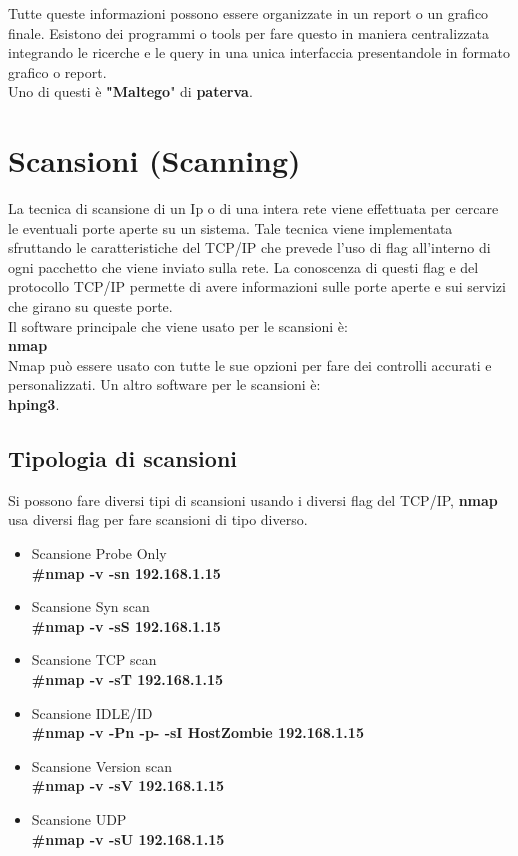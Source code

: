 \documentclass[a4paper,12pt]{article}
\begin{document}
Tutte queste informazioni possono essere organizzate in un report o un grafico finale. Esistono dei programmi o tools  per fare questo in maniera centralizzata integrando le ricerche e le query in una unica interfaccia presentandole in formato grafico o report.
\\ Uno di questi è \textbf{"Maltego}"\cite{maltego} di \textbf{paterva}\cite{paterva}. 

\section{ Scansioni (Scanning) }

La tecnica di scansione di un Ip o di una intera rete viene effettuata per cercare le eventuali porte aperte su un sistema. Tale tecnica viene implementata sfruttando le caratteristiche del TCP/IP che prevede l'uso di flag all'interno di ogni pacchetto che viene inviato sulla rete. La conoscenza di questi flag e del protocollo TCP/IP permette di avere informazioni sulle porte aperte e sui servizi che girano su queste porte. \\
Il software principale che viene usato per le scansioni è: \\
\textbf{nmap}\cite{nmap} \\
Nmap può essere usato con tutte le sue opzioni per fare dei controlli accurati e personalizzati.
Un altro software per le scansioni è: \\
\textbf{ hping3}\cite{hping3}.

\subsection{Tipologia di scansioni}
Si possono fare diversi tipi di scansioni usando i diversi flag del TCP/IP, \textbf{nmap}\cite{nmap}
usa diversi flag per fare scansioni di tipo diverso.
\begin{itemize}
    \item Scansione Probe Only \\
      \textbf{ \#nmap  -v -sn 192.168.1.15}
    \item Scansione Syn scan \\
        \textbf{ \#nmap  -v -sS 192.168.1.15}
    \item Scansione TCP scan \\
        \textbf{ \#nmap  -v -sT 192.168.1.15}
    \item Scansione IDLE/ID \\
        \textbf{ \#nmap  -v -Pn -p- -sI HostZombie 192.168.1.15} 
    \item Scansione Version scan \\
        \textbf{ \#nmap  -v -sV 192.168.1.15}
    \item Scansione UDP \\
        \textbf{ \#nmap  -v -sU 192.168.1.15}
\end{itemize}
\end{document}
